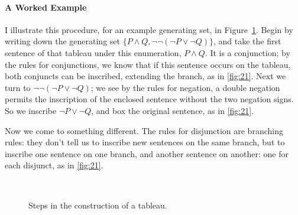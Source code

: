 \paragraph{A Worked Example} I illustrate this procedure, for an example generating set, in Figure~\ref{fig:21}. Begin by writing down the generating set $\{P\wedge Q,¬¬(¬P \vee ¬Q)\}$, and take the first sentence of that tableau under this enumeration, $P \wedge Q$. It is a conjunction; by the rules for conjunctions, we know that if this sentence occurs on the tableau, both conjuncts can be inscribed, extending the branch, as in \autoref{fig:21}. Next we turn to $\neg \neg(\neg P \vee \neg Q)$; we see by the rules for negation, a double negation permits the inscription of the enclosed sentence without the two negation signs. So we inscribe $\neg P \vee \neg Q$, and box the original sentence, as in \autoref{fig:21}.

 Now we come to something different. The rules for disjunction are branching rules: they don't tell us to inscribe new sentences on the same branch, but to inscribe one sentence on one branch, and another sentence on another: one for each disjunct, as in \autoref{fig:21}.



\begin{figure}[t]
    \centering
   \qquad
   \\
   \qquad

    \caption{Steps in the construction of a tableau. \label{fig:21}}
\end{figure}

